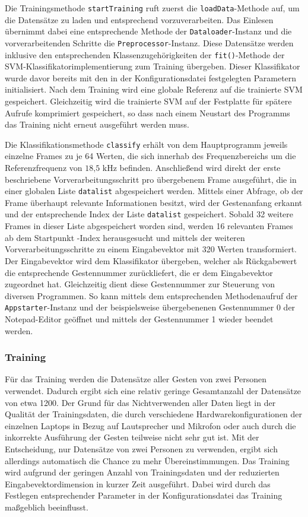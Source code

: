 Die Trainingsmethode \texttt{startTraining} ruft zuerst die \texttt{loadData}-Methode auf, um die Datensätze zu laden und entsprechend vorzuverarbeiten.
Das Einlesen übernimmt dabei eine entsprechende Methode der \texttt{Dataloader}-Instanz und die vorverarbeitenden Schritte die \texttt{Preprocessor}-Instanz.
Diese Datensätze werden inklusive den entsprechenden Klassenzugehörigkeiten der \texttt{fit()}-Methode der \ac{SVM}-Klassifikatorimplementierung zum Training übergeben.
Dieser Klassifikator wurde davor bereits mit den in der Konfigurationsdatei festgelegten Parametern initialisiert.
Nach dem Training wird eine globale Referenz auf die trainierte \ac{SVM} gespeichert.
Gleichzeitig wird die trainierte \ac{SVM} auf der Festplatte für spätere Aufrufe komprimiert gespeichert, so dass nach einem Neustart des Programms das Training nicht erneut ausgeführt werden muss.

Die Klassifikationsmethode \texttt{classify} erhält von dem Hauptprogramm jeweils einzelne Frames zu je 64 Werten, die sich innerhab des Frequenzbereichs um die Referenzfrequenz von $18\text{,}5\text{ kHz}$ befinden.
Anschließend wird direkt der erste beschriebene Vorverarbeitungsschritt pro übergebenem Frame ausgeführt, die in einer globalen Liste \texttt{datalist} abgespeichert werden.
Mittels einer Abfrage, ob der Frame überhaupt relevante Informationen besitzt, wird der Gestenanfang erkannt und der entsprechende Index der Liste \texttt{datalist} gespeichert.
Sobald 32 weitere Frames in dieser Liste abgespeichert worden sind, werden 16 relevanten Frames ab dem Startpunkt -Index herausgesucht und mittels der weiteren Vorverarbeitungsschritte zu einem Eingabevektor mit 320 Werten transformiert.
Der Eingabevektor wird dem Klassifikator übergeben, welcher als Rückgabewert die entsprechende Gestennummer zurückliefert, die er dem Eingabevektor zugeordnet hat.
Gleichzeitig dient diese Gestennummer zur Steuerung von diversen Programmen.
So kann mittels dem entsprechenden Methodenaufruf der \texttt{Appstarter}-Instanz und der beispielsweise übergebenenen Gestennummer 0 der Notepad-Editor geöffnet und mittels der Gestennummer 1 wieder beendet werden.

\subsubsection{Training}\label{sec:svm_training}
Für das Training werden die Datensätze aller Gesten von zwei Personen verwendet.
Dadurch ergibt sich eine relativ geringe Gesamtanzahl der Datensätze von etwa 1200.
Der Grund für das Nichtverwenden aller Daten liegt in der Qualität der Trainingsdaten, die durch verschiedene Hardwarekonfigurationen der einzelnen Laptops in Bezug auf Lautsprecher und Mikrofon oder auch durch die inkorrekte Ausführung der Gesten teilweise nicht sehr gut ist.
Mit der Entscheidung, nur Datensätze von zwei Personen zu verwenden, ergibt sich allerdings automatisch die Chance zu mehr Übereinstimmungen.
Das Training wird aufgrund der geringen Anzahl von Trainingsdaten und der reduzierten Eingabevektordimension in kurzer Zeit ausgeführt.
Dabei wird durch das Festlegen entsprechender Parameter in der Konfigurationsdatei das Training maßgeblich beeinflusst. 

